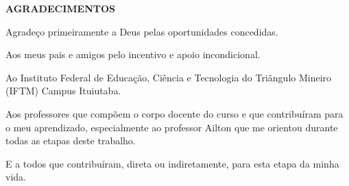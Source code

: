 \newpage
\thispagestyle{empty}

\begin{center}
\textbf{AGRADECIMENTOS}
\vspace*{3.5 cm}
\end{center}

\indent Agradeço primeiramente a Deus pelas oportunidades concedidas.

Aos meus pais e amigos pelo incentivo e apoio incondicional.

Ao Instituto Federal de Educação, Ciência e Tecnologia do Triângulo Mineiro (IFTM) Campus Ituiutaba.

Aos professores que compõem o corpo docente do curso e que contribuíram para o meu aprendizado, especialmente ao professor Ailton que me orientou durante todas as etapas deste trabalho.

E a todos que contribuíram, direta ou indiretamente, para esta etapa da minha vida.